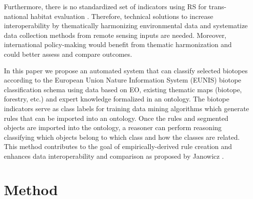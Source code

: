 \documentclass[authoryear, review,12pt,number]{elsarticle}
\begin{document}
Furthermore, there is no
standardized set of indicators using RS for trans-national habitat evaluation
\citep{Lucas2015}. Therefore, technical solutions to increase interoperability
by thematically harmonizing environmental data and systematize data collection
methods from remote sensing inputs %
are needed. Moreover, international policy-making would benefit from thematic
harmonization and could better assess and compare outcomes. 

In this paper we propose an automated system that can classify selected 
biotopes according to the European Union Nature Information System (EUNIS)
biotope classification schema using data based on EO, existing thematic 
maps (biotope, forestry, etc.) and expert knowledge formalized in an ontology.
The biotope indicators serve as class labels for training data mining
algorithms which generate rules that can be imported into an ontology. Once the
rules and segmented objects are imported into the ontology, a reasoner can
perform reasoning classifying which objects belong to which
class and how the classes are related. This method contributes to the goal of
empirically-derived rule creation and enhances data interoperability and
comparison as proposed by Janowicz \citep{Janowicz2012}.
\section{Method}
\end{document}
